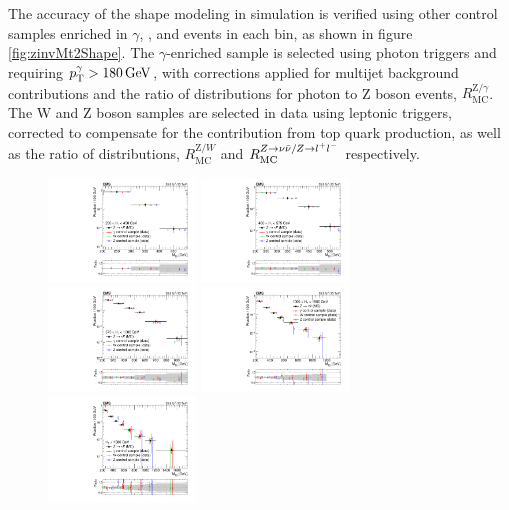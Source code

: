 The accuracy of the \mttwo shape modeling in simulation is verified using other control samples enriched in $\gamma$, \wlnu, and \zll events in each \HT bin, as shown in figure \ref{fig:zinvMt2Shape}. The $\gamma$-enriched sample is selected using photon triggers and requiring $p_{\mathrm{T}}^{\gamma} > 180\,\text{Ge\hspace{-.08em}V}$, with corrections applied for multijet background contributions and the ratio of \mttwo distributions for photon to Z boson events, $R_{\mathrm{MC}}^{\mathrm{Z}/\gamma}$. The W and Z boson samples are selected in data using leptonic triggers, corrected to compensate for the contribution from top quark production, as well as the ratio of \mttwo distributions, $R_{\mathrm{MC}}^{\mathrm{Z}/W}$ and $R_{\mathrm{MC}}^{Z\rightarrow\nu\bar{\nu}/Z\rightarrow l^+ l^-}$ respectively.
\begin{figure}
	\centering
	\includegraphics[width=0.35\textwidth]{backgrounds/figs/MT2VL_W_GJ_log}
	\includegraphics[width=0.35\textwidth]{backgrounds/figs/MT2L_W_GJ_log}
	\includegraphics[width=0.35\textwidth]{backgrounds/figs/MT2M_W_GJ_log}
	\includegraphics[width=0.35\textwidth]{backgrounds/figs/MT2H_W_GJ_log}
	\includegraphics[width=0.35\textwidth]{backgrounds/figs/MT2UH_W_GJ_log}

\end{figure}

